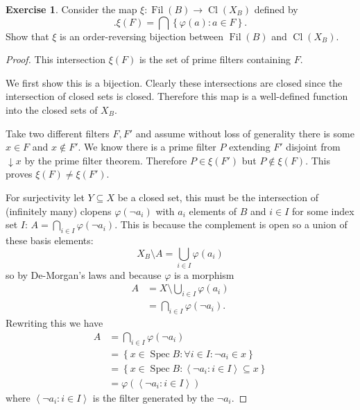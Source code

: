 \documentclass{article}
\newcommand{\tuple}[2]{\left\langle#1\colon #2\right\rangle}
\newcommand{\set}[1]{\left\{#1\right\}}
\newcommand{\setwith}[2]{\set{#1:#2}}
\DeclareMathOperator{\spec}{Spec}
\DeclareMathOperator{\filters}{Fil}
\DeclareMathOperator{\closed}{Cl}
\theoremstyle{definition}
\newtheorem{question}{Exercise}
\begin{document}
\begin{question}
    Consider the map \(\xi:\filters(B)\to\closed(X_{B})\) defined by
    \[
        .\xi(F)=\bigcap\setwith{\varphi(a)}{a\in F}.
    \]
    Show that \(\xi\) is an order-reversing bijection between \(\filters(B)\)
    and \(\closed(X_{B})\).

    \begin{proof}
        This intersection \(\xi(F)\) is the set of prime filters containing
        \(F\).

        We first show this is a bijection. Clearly these intersections are
        closed since the intersection of closed sets is closed. Therefore this
        map is a well-defined function into the closed sets of \(X_{B}\).

        Take two different filters \(F,F'\) and assume without loss of
        generality there is some \(x\in F\) and \(x\notin F'\). We know there is
        a prime filter \(P\) extending \(F'\) disjoint from \(\downarrow x\) by
        the prime filter theorem. Therefore \(P\in\xi(F')\) but
        \(P\notin\xi(F)\). This proves \(\xi(F)\neq\xi(F')\).

        For surjectivity let \(Y\subseteq X\) be a closed set, this must be the
        intersection of (infinitely many) clopens \(\varphi(\neg a_{i})\) with
        \(a_{i}\) elements of \(B\) and \(i\in I\) for some index set \(I\):
        \(A=\bigcap_{i\in I}\varphi(\neg a_{i})\). This is because the
        complement is open so a union of these basis elements:
        \[
            X_{B}\setminus A=\bigcup_{i\in I}\varphi(a_{i})
        \]
        so by De-Morgan's laws and because \(\varphi\) is a morphism
        \begin{align*}
            A & =X\setminus\bigcup_{i\in I}\varphi(a_{i}) \\
              & =\bigcap_{i\in I}\varphi(\neg a_{i}).
        \end{align*}
        Rewriting this we have
        \begin{align*}
            A & =\bigcap_{i\in I}\varphi(\neg a_{i})                          \\
              & =\setwith{x\in\spec B}{\forall i\in I:\neg a_{i}\in x}        \\
              & =\setwith{x\in\spec B}{\tuple{\neg a_{i}}{i\in I}\subseteq x} \\
              & =\varphi(\tuple{\neg a_{i}}{i\in I})
        \end{align*}
        where \(\tuple{\neg a_{i}}{i\in I}\) is the filter generated by the
        \(\neg a_{i}\).


\end{proof}
\end{question}
\end{document}
